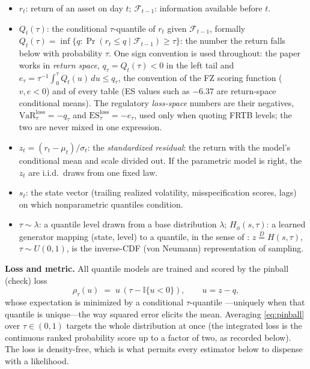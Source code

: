 \documentclass[11pt]{article}
\newcommand{\VaR}{\mathrm{VaR}}
\newcommand{\ES}{\mathrm{ES}}
\theoremstyle{remark}
\begin{document}
\begin{itemize}[leftmargin=1.5em,itemsep=0pt]
\item $r_t$: return of an asset on day $t$; $\mathcal{F}_{t-1}$: information available before $t$.
\item $Q_t(\tau)$: the conditional $\tau$-quantile of $r_t$ given
$\mathcal{F}_{t-1}$, formally
$Q_t(\tau) = \inf\{q : \Pr(r_t \le q \mid \mathcal{F}_{t-1}) \ge \tau\}$:
the number the return falls below with probability $\tau$. One sign
convention is used throughout: the paper works in \emph{return space},
$q_\tau = Q_t(\tau) < 0$ in the left tail and
$e_\tau = \tau^{-1}\int_0^{\tau} Q_t(u)\,du \le q_\tau$, the
convention of the FZ scoring function ($v,e<0$) and of every table
(ES values such as $-6.37$ are return-space conditional means). The
regulatory \emph{loss-space} numbers are their negatives,
$\VaR^{\mathrm{loss}}_\tau=-q_\tau$ and
$\ES^{\mathrm{loss}}_\tau=-e_\tau$, used only when quoting FRTB
levels; the two are never mixed in one expression.
\item $z_t = (r_t-\mu_t)/\sigma_t$: the \emph{standardized residual}:
the return with the model's conditional mean and scale divided out. If
the parametric model is right, the $z_t$ are i.i.d.\ draws from one
fixed law.
\item $s_t$: the state vector (trailing realized volatility,
misspecification scores, lags) on which nonparametric quantiles condition.
\item $\tau \sim \lambda$: a quantile level drawn from a base
distribution $\lambda$; $H_\phi(s,\tau)$: a learned generator mapping
(state, level) to a quantile, in the sense of
\citet{polson2023gbc}: $z \overset{D}{=} H(s,\tau)$, $\tau\sim U(0,1)$,
is the inverse-CDF (von Neumann) representation of sampling.
\end{itemize}

\noindent\textbf{Loss and metric.} All quantile models are trained and
scored by the pinball (check) loss
\begin{equation}
\rho_\tau(u) \;=\; u\,(\tau - \mathbb{I}\{u<0\}),
\qquad u = z - q,
\label{eq:pinball}
\end{equation}
whose expectation is minimized by a conditional $\tau$-quantile
\citep{koenker1978}---uniquely when that quantile is unique---the way squared
error elicits the mean. Averaging \eqref{eq:pinball} over $\tau\in(0,1)$
targets the whole distribution at once (the integrated loss is the
continuous ranked probability score up to a factor of two, as recorded
below). The loss is density-free, which is what permits every estimator
below to dispense with a likelihood.
\end{document}

